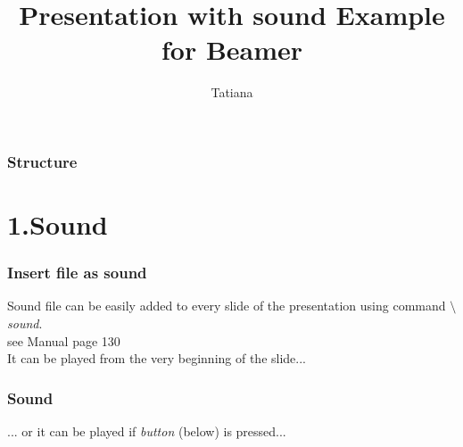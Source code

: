 \documentclass[envcountsect]{beamer}
\title
{Presentation with sound \newline Example for Beamer}
\author[]{Tatiana}
\institute[University of Leicester]
{University of Leicester}
\begin{document}
\begin{frame}
  \titlepage
\end{frame}

\begin{frame}
\frametitle{Structure }
\tableofcontents
{}
\end{frame}


\section{1.Sound}
\begin{frame}
\frametitle{Insert file as sound}
\transwipe {}
Sound file can be easily added to every slide of the presentation using command {\it $\setminus$sound}.\\
see Manual page 130\\

\vspace{10pt}
It can be played from the very beginning of the slide...
\end{frame}

\begin{frame}
\frametitle{Sound}
\transblindsvertical
{}


... or it can be played if {\it button} (below) is pressed...\\
\vspace{10pt}

\\


\end{frame}
\end{document}
